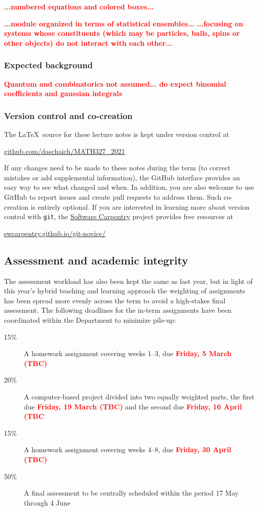 \documentclass[12 pt]{article}
\newcommand{\TODO}[1]{\textcolor{red}{\textbf{#1}}}
\begin{document}
\TODO{...numbered equations and colored boxes...}

\TODO{...module organized in terms of statistical ensembles...}
\TODO{...focusing on systems whose constituents (which may be particles, balls, spins or other objects) do not interact with each other...}

\subsubsection*{Expected background}
\TODO{Quantum and combinatorics not assumed... do expect binomial coefficients and gaussian integrals}

\subsubsection*{Version control and co-creation}
The \LaTeX\ source for these lecture notes is kept under version control at \\
\centerline{\href{https://github.com/daschaich/MATH327_2021}{github.com/daschaich/MATH327\_2021}}
If any changes need to be made to these notes during the term (to correct mistakes or add supplemental information), the GitHub interface provides an easy way to see what changed and when.
In addition, you are also welcome to use GitHub to report issues and create pull requests to address them.
Such co-creation is entirely optional.
If you are interested in learning more about version control with \texttt{git}, the \href{https://software-carpentry.org}{Software Carpentry} project provides free resources at \\
\centerline{\href{https://swcarpentry.github.io/git-novice/}{swcarpentry.github.io/git-novice/}}



\subsection*{Assessment and academic integrity}
The assessment workload has also been kept the same as last year, but in light of this year's hybrid teaching and learning approach the weighting of assignments has been spread more evenly across the term to avoid a high-stakes final assessment.
The following deadlines for the in-term assignments have been coordinated within the Department to minimize pile-up: \\[-24 pt]
\begin{description}
  \item[15\%] A homework assignment covering weeks 1--3, due \TODO{Friday, 5 March (TBC)}
  \item[20\%] A computer-based project divided into two equally weighted parts, the first due \TODO{Friday, 19 March (TBC)} and the second due \TODO{Friday, 16 April (TBC}
  \item[15\%] A homework assignment covering weeks 4--8, due \TODO{Friday, 30 April (TBC)}
  \item[50\%] A final assessment to be centrally scheduled within the period 17 May through 4 June
\end{description}
\end{document}
